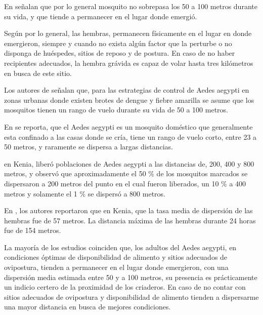 En \citet{cabezas2005dengue} señalan que por lo general mosquito no sobrepasa los 50 a 100 metros
durante su vida, y que tiende a permanecer en el lugar donde emergió.

Según \citet{ThironIzcazaJ2003} por lo general, las hembras, permanecen físicamente en el lugar en
donde emergieron, siempre y cuando no exista algún factor que la perturbe o no disponga de
huéspedes, sitios de reposo y de postura. En caso de no haber recipientes adecuados, la hembra
grávida es capaz de volar hasta tres kilómetros en busca de este sitio.

Los autores de \citet{dengueUruguayCap8} señalan que, para las estrategias de control de Aedes
aegypti en zonas urbanas donde existen brotes de dengue y fiebre amarilla se asume que los
mosquitos tienen un rango de vuelo durante su vida de 50 a 100 metros.

En \citet{luevano1993ciclo} se reporta, que el Aedes aegypti es un mosquito doméstico que
generalmente esta confinado a las casas donde se cría, tiene un rango de vuelo corto, entre 23 a
50 metros, y raramente se dispersa a largas distancias.

\citet{mcdonald1977population} en Kenia, liberó poblaciones de Aedes aegypti a las distancias de,
200, 400 y 800 metros, y observó que aproximadamente el 50 \% de los mosquitos marcados se
dispersaron a 200 metros del punto en el cual fueron liberados, un 10 \% a 400 metros y solamente
el 1 \% se dispersó a 800 metros.

En \citet{trpis1986dispersal}, los autores reportaron que en Kenia, que la tasa media de dispersión
de las hembras fue de 57 metros. La distancia máxima de las hembras durante 24 horas fue de 154
metros.

La mayoría de los estudios coinciden que, los adultos del Aedes aegypti, en condiciones óptimas de
disponibilidad de alimento y sitios adecuados de ovipostura, tienden a permanecer en el lugar
donde emergieron, con una dispersión media estimada entre 50 y a 100 metros, su presencia es
prácticamente un indicio certero de la proximidad de los criaderos. En caso de no contar con
sitios adecuados de ovipostura y disponibilidad de alimento tienden a dispersarme una mayor
distancia en busca de mejores condiciones.
